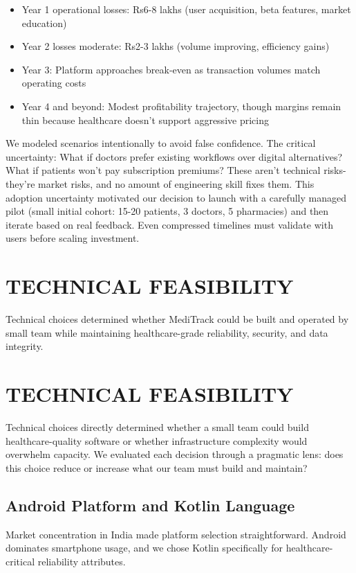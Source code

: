 \documentclass[12pt,a4paper]{report}
\begin{document}
\begin{itemize}
  \item Year 1 operational losses: Rs6-8 lakhs (user acquisition, beta features, market education)
  \item Year 2 losses moderate: Rs2-3 lakhs (volume improving, efficiency gains)
  \item Year 3: Platform approaches break-even as transaction volumes match operating costs
  \item Year 4 and beyond: Modest profitability trajectory, though margins remain thin because healthcare doesn't support aggressive pricing
\end{itemize}

We modeled scenarios intentionally to avoid false confidence. The critical uncertainty: What if doctors prefer existing workflows over digital alternatives? What if patients won't pay subscription premiums? These aren't technical risks-they're market risks, and no amount of engineering skill fixes them. This adoption uncertainty motivated our decision to launch with a carefully managed pilot (small initial cohort: 15-20 patients, 3 doctors, 5 pharmacies) and then iterate based on real feedback. Even compressed timelines must validate with users before scaling investment.

\section{TECHNICAL FEASIBILITY}

Technical choices determined whether MediTrack could be built and operated by small team while maintaining healthcare-grade reliability, security, and data integrity.

\section{TECHNICAL FEASIBILITY}

Technical choices directly determined whether a small team could build healthcare-quality software or whether infrastructure complexity would overwhelm capacity. We evaluated each decision through a pragmatic lens: does this choice reduce or increase what our team must build and maintain?

\subsection{Android Platform and Kotlin Language}

Market concentration in India made platform selection straightforward. Android dominates smartphone usage, and we chose Kotlin specifically for healthcare-critical reliability attributes.
\end{document}
